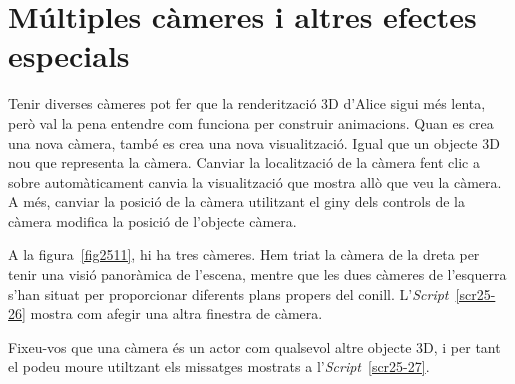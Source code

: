 
\section{Múltiples càmeres i altres efectes especials}
Tenir diverses càmeres pot fer que la renderització 3D d'Alice sigui més lenta, però val la pena entendre com funciona per construir animacions. Quan es crea una nova càmera, també es crea una nova visualització. Igual que un objecte 3D nou que representa la càmera. Canviar la localització de la càmera fent clic a sobre automàticament canvia la visualització que mostra allò que veu la càmera. A més, canviar la posició de la càmera utilitzant el giny dels controls de la càmera modifica la posició de l'objecte càmera.

A la figura~\ref{fig2511}, hi ha tres càmeres. Hem triat la càmera de la dreta per tenir una visió panoràmica de l'escena, mentre que les dues càmeres de l'esquerra s'han situat per proporcionar diferents plans propers del conill. L'\emph{Script}~\ref{scr25-26} mostra com afegir una altra finestra de càmera.


Fixeu-vos que una càmera és un actor com qualsevol altre objecte 3D, i per tant el podeu moure utiltzant els missatges mostrats a l'\emph{Script}~\ref{scr25-27}.

